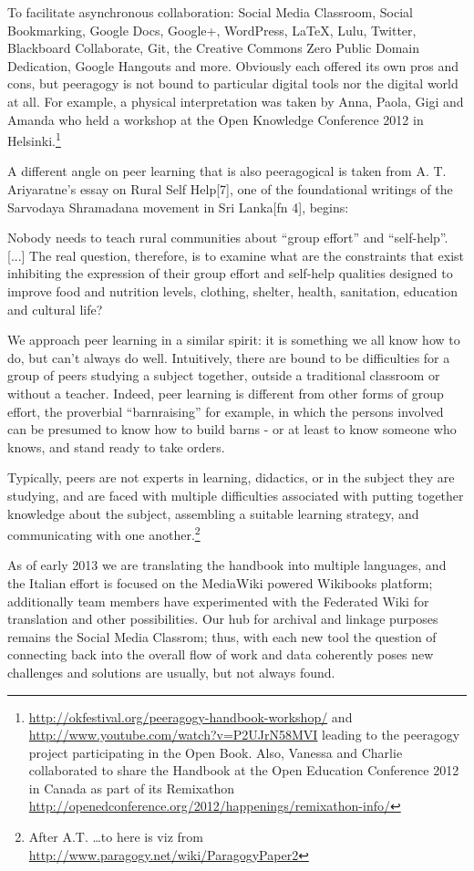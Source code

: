 \documentclass{acm_proc_article-sp}
\begin{document}
To facilitate asynchronous collaboration: Social Media Classroom, Social Bookmarking, Google Docs, Google+, WordPress, LaTeX, Lulu, Twitter, Blackboard Collaborate, Git, the Creative Commons Zero Public Domain Dedication, Google Hangouts and more. Obviously each offered its own pros and cons, but peeragogy is not bound to particular digital tools nor the digital world at all. For example, a physical interpretation was taken by Anna, Paola, Gigi and Amanda who held a workshop at the Open Knowledge Conference 2012 in Helsinki.\footnote{ \url{http://okfestival.org/peeragogy-handbook-workshop/} and \url{http://www.youtube.com/watch?v=P2UJrN58MVI} leading to the peeragogy project participating in the Open Book. Also, Vanessa and Charlie collaborated to share the Handbook at the Open Education Conference 2012 in Canada as part of its Remixathon \url{http://openedconference.org/2012/happenings/remixathon-info/}}

A different angle on peer learning that is also peeragogical is taken from A. T. Ariyaratne's essay on Rural Self Help[7], one of the foundational writings of the Sarvodaya Shramadana movement in Sri Lanka[fn 4], begins:

Nobody needs to teach rural communities about ``group effort'' and ``self-help''. [...] The real question, therefore, is to examine what are the constraints that exist inhibiting the expression of their group effort and self-help qualities designed to improve food and nutrition levels, clothing, shelter, health, sanitation, education and cultural life?

We approach peer learning in a similar spirit: it is something we all know how to do, but can't always do well. Intuitively, there are bound to be difficulties for a group of peers studying a subject together, outside a traditional classroom or without a teacher. Indeed, peer learning is different from other forms of group effort, the proverbial ``barnraising'' for example, in which the persons involved can be presumed to know how to build barns - or at least to know someone who knows, and stand ready to take orders.

Typically, peers are not experts in learning, didactics, or in the subject they are studying, and are faced with multiple difficulties associated with putting together knowledge about the subject, assembling a suitable learning strategy, and communicating with one another.\footnote{After A.T. \ldots to here is viz from \url{http://www.paragogy.net/wiki/ParagogyPaper2}}

As of early 2013 we are translating the handbook into multiple languages, and the Italian effort is focused on the MediaWiki powered Wikibooks platform; additionally team members have experimented with the Federated Wiki for translation and other possibilities. Our hub for archival and linkage purposes remains the Social Media Classrom; thus, with each new tool the question of connecting back into the overall flow of work and data coherently poses new challenges and solutions are usually, but not always found.
\end{document}
